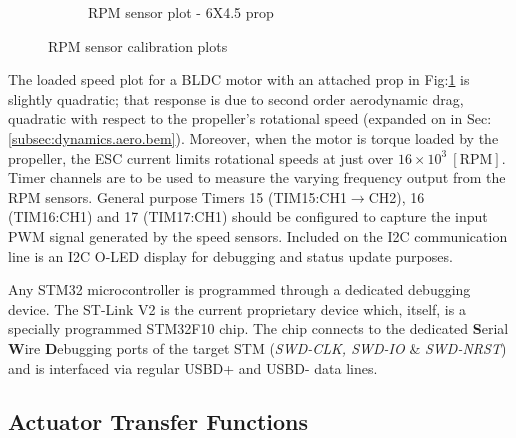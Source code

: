\begin{figure}[htbp]
\begin{subfigure}{0.5\textwidth}
\caption{RPM sensor plot - 6X4.5 prop}
\label{fig:rpm-sensor-prop}
\end{subfigure}
\vspace{-4pt}
\caption{RPM sensor calibration plots}
\label{fig:rpm-sensor}
\vspace{-14pt}
\end{figure}
\par
The loaded speed plot for a BLDC motor with an attached prop in Fig:\ref{fig:rpm-sensor-prop} is slightly quadratic; that response is due to second order aerodynamic drag, quadratic with respect to the propeller's rotational speed (expanded on in Sec:\ref{subsec:dynamics.aero.bem}). Moreover, when the motor is torque loaded by the propeller, the ESC current limits rotational speeds at just over $16\times 10^3~[\text{RPM}]$. Timer channels are to be used to measure the varying frequency output from the RPM sensors. General purpose Timers 15 (TIM15:CH1$\rightarrow$CH2), 16 (TIM16:CH1) and 17 (TIM17:CH1) should be configured to capture the input PWM signal generated by the speed sensors. Included on the I2C communication line is an I2C O-LED display for debugging and status update purposes.
\par
Any STM32 microcontroller is programmed through a dedicated debugging device. The ST-Link V2\cite{st-link} is the current proprietary device which, itself, is a specially programmed STM32F10 chip. The chip connects to the dedicated \textbf{S}erial \textbf{W}ire \textbf{D}ebugging ports of the target STM (\emph{SWD-CLK, SWD-IO} \& \emph{SWD-NRST}) and is interfaced via regular USBD+ and USBD- data lines. 
\subsection{Actuator Transfer Functions}
\label{subsec:proto.design.transfer}
